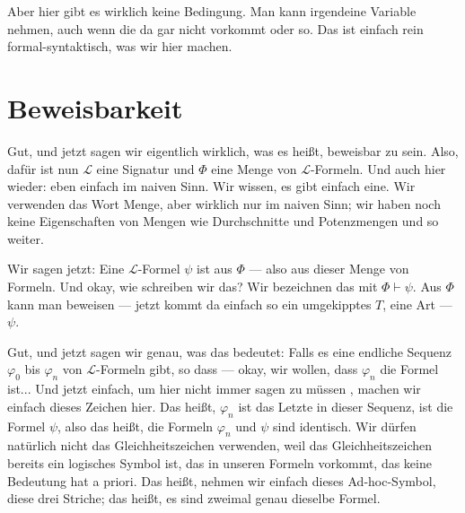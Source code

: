 \begin{spoken-clean}[00:15:45 - 00:18:00]
Aber hier gibt es wirklich keine Bedingung. Man kann irgendeine Variable nehmen, auch wenn die da gar nicht vorkommt oder so. Das ist einfach rein formal-syntaktisch, was wir hier machen.
\end{spoken-clean}

\section{Beweisbarkeit}

\begin{spoken-clean}[00:18:00 - 00:20:15]
Gut, und jetzt sagen wir eigentlich wirklich, was es heißt, beweisbar zu sein. Also, dafür ist nun $\mathcal{L}$ eine Signatur und $\Phi$ eine Menge von $\mathcal{L}$-Formeln. Und auch hier wieder:  eben einfach im naiven Sinn. Wir wissen, es gibt einfach eine. Wir verwenden das Wort Menge, aber wirklich nur im naiven Sinn; wir haben noch keine Eigenschaften von Mengen wie Durchschnitte und Potenzmengen und so weiter.

Wir sagen jetzt: Eine $\mathcal{L}$-Formel $\psi$ ist  aus $\Phi$ --- also aus dieser Menge von Formeln. Und okay, wie schreiben wir das? Wir bezeichnen das mit $\Phi \vdash \psi$. Aus $\Phi$ kann man beweisen --- jetzt kommt da einfach so ein umgekipptes $T$, eine Art --- $\psi$.

Gut, und jetzt sagen wir genau, was das bedeutet: Falls es eine endliche Sequenz $\varphi_0$ bis $\varphi_n$ von $\mathcal{L}$-Formeln gibt, so dass --- okay, wir wollen, dass $\varphi_n$ die Formel ist... Und jetzt einfach, um hier nicht immer sagen zu müssen , machen wir einfach dieses Zeichen hier. Das heißt, $\varphi_n$ ist das Letzte in dieser Sequenz, ist die Formel $\psi$, also das heißt, die Formeln $\varphi_n$ und $\psi$ sind identisch. Wir dürfen natürlich nicht das Gleichheitszeichen verwenden, weil das Gleichheitszeichen bereits ein logisches Symbol ist, das in unseren Formeln vorkommt, das keine Bedeutung hat a priori. Das heißt, nehmen wir einfach dieses Ad-hoc-Symbol, diese drei Striche; das heißt, es sind zweimal genau dieselbe Formel.
\end{spoken-clean}

